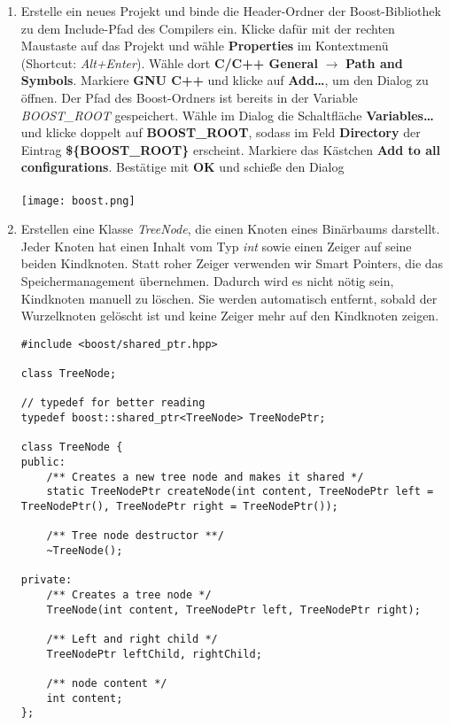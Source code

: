 \documentclass[
  accentcolor=tud1c,	%
  colorbacktitle,		%
  inverttitle,			%
  german,				%
  twoside
]{tudexercise}
\begin{document}
\begin{enumerate}
\item
Erstelle ein neues Projekt und binde die Header-Ordner der Boost-Bibliothek zu dem Include-Pfad des Compilers ein.
Klicke dafür mit der rechten Maustaste auf das Projekt und wähle \textbf{Properties} im Kontextmenü (Shortcut: \emph{Alt+Enter}).
Wähle dort \textbf{C/C++ General} $\rightarrow$ \textbf{Path and Symbols}. Markiere \textbf{GNU C++} und klicke auf \textbf{Add\dots}, um den Dialog zu öffnen.
Der Pfad des Boost-Ordners ist bereits in der Variable \emph{BOOST\_ROOT} gespeichert.
Wähle im Dialog die Schaltfläche \textbf{Variables\dots} und klicke doppelt auf \textbf{BOOST\_ROOT}, sodass im Feld \textbf{Directory} der Eintrag \textbf{\$\{BOOST\_ROOT\}} erscheint.
Markiere das Kästchen \textbf{Add to all configurations}.
Bestätige mit \textbf{OK} und schieße den Dialog\\\\
\texttt{[image: boost.png]}

\item Erstellen eine Klasse \emph{TreeNode}, die einen Knoten eines Binärbaums darstellt.
Jeder Knoten hat einen Inhalt vom Typ \emph{int} sowie einen Zeiger auf seine beiden Kindknoten.
Statt \glqq roher\grqq{} Zeiger verwenden wir Smart Pointers, die das Speichermanagement übernehmen.
Dadurch wird es nicht nötig sein, Kindknoten manuell zu löschen.
Sie werden automatisch entfernt, sobald der Wurzelknoten gelöscht ist und keine Zeiger mehr auf den Kindknoten zeigen.

\begin{lstlisting}
#include <boost/shared_ptr.hpp>

class TreeNode;

// typedef for better reading
typedef boost::shared_ptr<TreeNode> TreeNodePtr;

class TreeNode {
public:
	/** Creates a new tree node and makes it shared */
	static TreeNodePtr createNode(int content, TreeNodePtr left = TreeNodePtr(), TreeNodePtr right = TreeNodePtr());

	/** Tree node destructor **/
	~TreeNode();

private:
	/** Creates a tree node */
	TreeNode(int content, TreeNodePtr left, TreeNodePtr right);

	/** Left and right child */
	TreeNodePtr leftChild, rightChild;

	/** node content */
	int content;
};
\end{lstlisting}


\end{enumerate}
\end{document}
